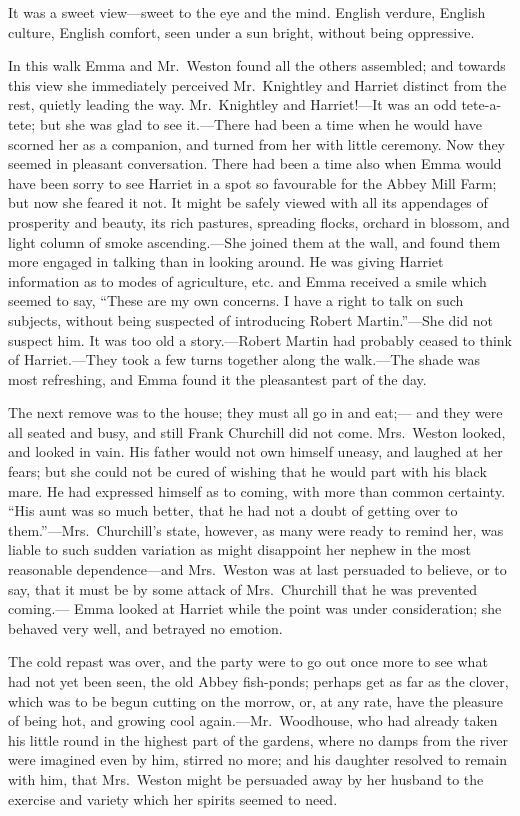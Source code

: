 It was a sweet view---sweet to the eye and the mind.  English verdure,
English culture, English comfort, seen under a sun bright,
without being oppressive.

In this walk Emma and Mr.\ Weston found all the others assembled;
and towards this view she immediately perceived Mr.\ Knightley
and Harriet distinct from the rest, quietly leading the way.
Mr.\ Knightley and Harriet!---It was an odd tete-a-tete; but she was
glad to see it.---There had been a time when he would have scorned
her as a companion, and turned from her with little ceremony.
Now they seemed in pleasant conversation.  There had been a time
also when Emma would have been sorry to see Harriet in a spot
so favourable for the Abbey Mill Farm; but now she feared it not.
It might be safely viewed with all its appendages of prosperity
and beauty, its rich pastures, spreading flocks, orchard in blossom,
and light column of smoke ascending.---She joined them at the wall,
and found them more engaged in talking than in looking around.
He was giving Harriet information as to modes of agriculture, etc.
and Emma received a smile which seemed to say, ``These are my
own concerns.  I have a right to talk on such subjects, without being
suspected of introducing Robert Martin.''---She did not suspect him.
It was too old a story.---Robert Martin had probably ceased to think
of Harriet.---They took a few turns together along the walk.---The shade
was most refreshing, and Emma found it the pleasantest part of
the day.

The next remove was to the house; they must all go in and eat;---%
and they were all seated and busy, and still Frank Churchill did
not come.  Mrs.\ Weston looked, and looked in vain.  His father would
not own himself uneasy, and laughed at her fears; but she could
not be cured of wishing that he would part with his black mare.
He had expressed himself as to coming, with more than common certainty.
``His aunt was so much better, that he had not a doubt of getting
over to them.''---Mrs.\ Churchill's state, however, as many were ready
to remind her, was liable to such sudden variation as might disappoint
her nephew in the most reasonable dependence---and Mrs.\ Weston
was at last persuaded to believe, or to say, that it must be
by some attack of Mrs.\ Churchill that he was prevented coming.---%
Emma looked at Harriet while the point was under consideration;
she behaved very well, and betrayed no emotion.

The cold repast was over, and the party were to go out once more
to see what had not yet been seen, the old Abbey fish-ponds;
perhaps get as far as the clover, which was to be begun cutting
on the morrow, or, at any rate, have the pleasure of being hot,
and growing cool again.---Mr.\ Woodhouse, who had already taken
his little round in the highest part of the gardens, where no
damps from the river were imagined even by him, stirred no more;
and his daughter resolved to remain with him, that Mrs.\ Weston
might be persuaded away by her husband to the exercise and variety
which her spirits seemed to need.

